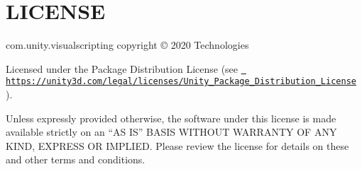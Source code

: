 \chapter{LICENSE}
\hypertarget{md__library_2_package_cache_2com_8unity_8visualscripting_0d1_89_82_2_l_i_c_e_n_s_e}{}\label{md__library_2_package_cache_2com_8unity_8visualscripting_0d1_89_82_2_l_i_c_e_n_s_e}
com.\+unity.\+visualscripting copyright © 2020  Technologies

Licensed under the  Package Distribution License (see \href{https://unity3d.com/legal/licenses/Unity_Package_Distribution_License}{\texttt{ https\+://unity3d.\+com/legal/licenses/\+Unity\+\_\+\+Package\+\_\+\+Distribution\+\_\+\+License}} ).

Unless expressly provided otherwise, the software under this license is made available strictly on an “\+AS IS” BASIS WITHOUT WARRANTY OF ANY KIND, EXPRESS OR IMPLIED. Please review the license for details on these and other terms and conditions. 